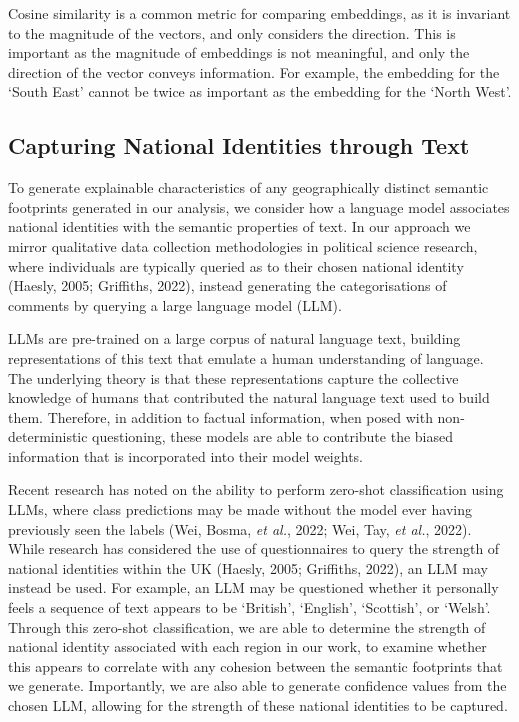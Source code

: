 \documentclass[
  letterpaper,
  11pt,
  english,
  onehalfspacing,
  headsepline]{MastersDoctoralThesis}
\begin{document}
Cosine similarity is a common metric for comparing embeddings, as it is
invariant to the magnitude of the vectors, and only considers the
direction. This is important as the magnitude of embeddings is not
meaningful, and only the direction of the vector conveys information.
For example, the embedding for the `South East' cannot be twice as
important as the embedding for the `North West'.

\hypertarget{capturing-national-identities-through-text}{%
\subsection{Capturing National Identities through
Text}\label{capturing-national-identities-through-text}}

To generate explainable characteristics of any geographically distinct
semantic footprints generated in our analysis, we consider how a
language model associates national identities with the semantic
properties of text. In our approach we mirror qualitative data
collection methodologies in political science research, where
individuals are typically queried as to their chosen national identity
(Haesly, 2005; Griffiths, 2022), instead generating the categorisations
of comments by querying a large language model (LLM).

LLMs are pre-trained on a large corpus of natural language text,
building representations of this text that emulate a human understanding
of language. The underlying theory is that these representations capture
the collective knowledge of humans that contributed the natural language
text used to build them. Therefore, in addition to factual information,
when posed with non-deterministic questioning, these models are able to
contribute the biased information that is incorporated into their model
weights.

Recent research has noted on the ability to perform zero-shot
classification using LLMs, where class predictions may be made without
the model ever having previously seen the labels (Wei, Bosma, \emph{et
al.}, 2022; Wei, Tay, \emph{et al.}, 2022). While research has
considered the use of questionnaires to query the strength of national
identities within the UK (Haesly, 2005; Griffiths, 2022), an LLM may
instead be used. For example, an LLM may be questioned whether it
personally feels a sequence of text appears to be `British', `English',
`Scottish', or `Welsh'. Through this zero-shot classification, we are
able to determine the strength of national identity associated with each
region in our work, to examine whether this appears to correlate with
any cohesion between the semantic footprints that we generate.
Importantly, we are also able to generate confidence values from the
chosen LLM, allowing for the strength of these national identities to be
captured.
\end{document}
